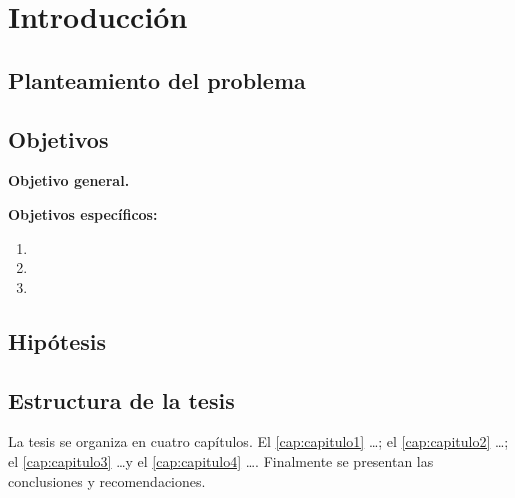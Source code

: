 \chapter*{Introducción}


\section*{Planteamiento del problema}

\lipsum[1]

\section*{Objetivos}

\textbf{Objetivo general.} \lipsum[2][1-3]

\textbf{Objetivos específicos:}
\begin{enumerate}
  \item \lipsum[3][1]
  \item \lipsum[3][2]
  \item \lipsum[3][3]
\end{enumerate}

\section*{Hipótesis}

\lipsum[4][1-4]

\section*{Estructura de la tesis}

La tesis se organiza en cuatro capítulos. El \cref{cap:capitulo1} \ldots; el
\cref{cap:capitulo2} \ldots; el \cref{cap:capitulo3} \ldots y el
\cref{cap:capitulo4} \ldots. Finalmente se presentan las conclusiones y
recomendaciones.

